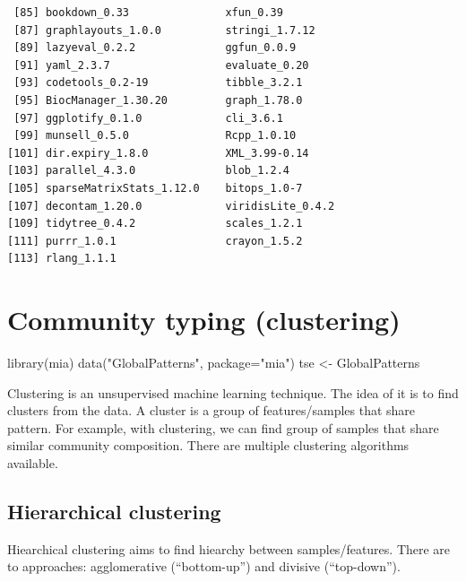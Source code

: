 \documentclass[
]{book}
\newenvironment{Shaded}{\begin{snugshade}}{\end{snugshade}}
\newcommand{\AttributeTok}[1]{\textcolor[rgb]{0.77,0.63,0.00}{#1}}
\newcommand{\FunctionTok}[1]{\textcolor[rgb]{0.00,0.00,0.00}{#1}}
\newcommand{\NormalTok}[1]{#1}
\newcommand{\OtherTok}[1]{\textcolor[rgb]{0.56,0.35,0.01}{#1}}
\newcommand{\StringTok}[1]{\textcolor[rgb]{0.31,0.60,0.02}{#1}}
\begin{document}
\begin{verbatim}
 [85] bookdown_0.33               xfun_0.39                  
 [87] graphlayouts_1.0.0          stringi_1.7.12             
 [89] lazyeval_0.2.2              ggfun_0.0.9                
 [91] yaml_2.3.7                  evaluate_0.20              
 [93] codetools_0.2-19            tibble_3.2.1               
 [95] BiocManager_1.30.20         graph_1.78.0               
 [97] ggplotify_0.1.0             cli_3.6.1                  
 [99] munsell_0.5.0               Rcpp_1.0.10                
[101] dir.expiry_1.8.0            XML_3.99-0.14              
[103] parallel_4.3.0              blob_1.2.4                 
[105] sparseMatrixStats_1.12.0    bitops_1.0-7               
[107] decontam_1.20.0             viridisLite_0.4.2          
[109] tidytree_0.4.2              scales_1.2.1               
[111] purrr_1.0.1                 crayon_1.5.2               
[113] rlang_1.1.1                
\end{verbatim}

\hypertarget{clustering}{%
\chapter{Community typing (clustering)}\label{clustering}}

\begin{Shaded}
\begin{Highlighting}[]
\FunctionTok{library}\NormalTok{(mia)}
\FunctionTok{data}\NormalTok{(}\StringTok{"GlobalPatterns"}\NormalTok{, }\AttributeTok{package=}\StringTok{"mia"}\NormalTok{)}
\NormalTok{tse }\OtherTok{\textless{}{-}}\NormalTok{ GlobalPatterns}
\end{Highlighting}
\end{Shaded}

Clustering is an unsupervised machine learning technique. The idea of
it is to find clusters from the data. A cluster is a group of
features/samples that share pattern. For example, with clustering, we
can find group of samples that share similar community
composition. There are multiple clustering algorithms available.

\hypertarget{hierarchical-clustering}{%
\section{Hierarchical clustering}\label{hierarchical-clustering}}

Hiearchical clustering aims to find hiearchy between
samples/features. There are to approaches: agglomerative (``bottom-up'')
and divisive (``top-down'').
\end{document}
